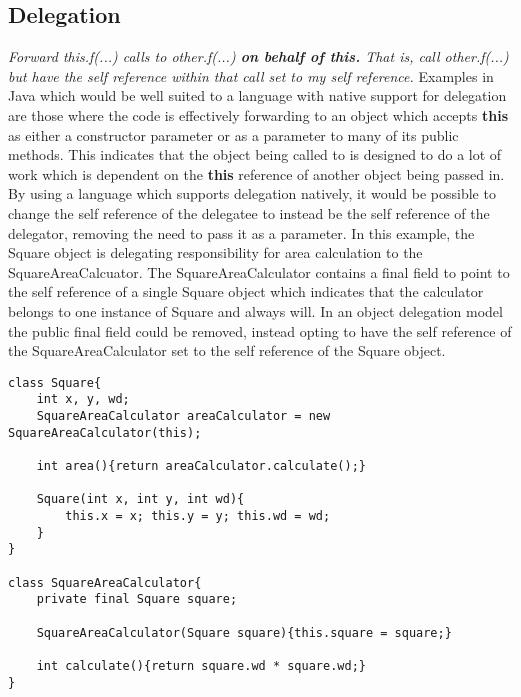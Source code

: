\subsection{Delegation}
\textit{Forward this.f(...) calls to other.f(...) \textbf{on behalf of this.}
That is, call other.f(...) but have the self reference within that call set to my self reference.}\newline\newline
Examples in Java which would be well suited to a language with native support for delegation are those where the code is effectively forwarding to an object which accepts \textbf{this} as either a constructor parameter or as a parameter to many of its public methods. This indicates that the object being called to is designed to do a lot of work which is dependent on the \textbf{this} reference of another object being passed in. By using a language which supports delegation natively, it would be possible to change the self reference of the delegatee to instead be the self reference of the delegator, removing the need to pass it as a parameter.\newline
In this example, the Square object is delegating responsibility for area calculation to the SquareAreaCalcuator. The SquareAreaCalculator contains a final field to point to the self reference of a single Square object which indicates that the calculator belongs to one instance of Square and always will. In an object delegation model the public final field could be removed, instead opting to have the self reference of the SquareAreaCalculator set to the self reference of the Square object.
\begin{lstlisting}
class Square{
	int x, y, wd;
	SquareAreaCalculator areaCalculator = new SquareAreaCalculator(this);
	
	int area(){return areaCalculator.calculate();}
	
	Square(int x, int y, int wd){
		this.x = x; this.y = y; this.wd = wd;
	}
}

class SquareAreaCalculator{
	private final Square square;
	
	SquareAreaCalculator(Square square){this.square = square;}
	
	int calculate(){return square.wd * square.wd;}
}
\end{lstlisting}

